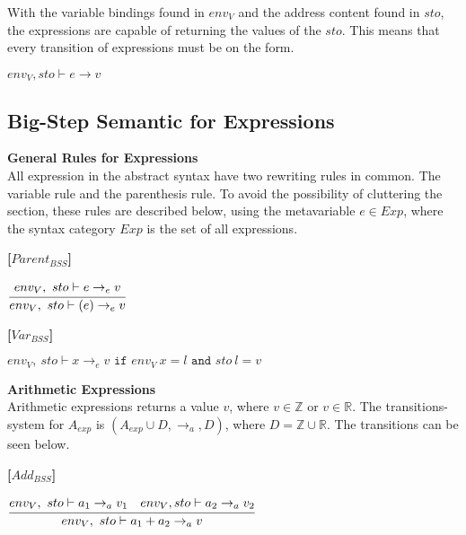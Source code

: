 {With the variable bindings found in $env_V$ and the address content found in $sto$, the expressions are capable of returning the values of the $sto$.
This means that every transition of expressions must be on the form.
\begin{center}
	$env_V,sto \vdash e \rightarrow v$
\end{center} 

\subsection{Big-Step Semantic for Expressions}

\textbf{\large{General Rules for Expressions}} \\
All expression in the abstract syntax have two rewriting rules in common.
The variable rule and the parenthesis rule.
To avoid the possibility of cluttering the section, these rules are described below, using the metavariable $e \in Exp$, where the syntax category $Exp$ is the set of all expressions.

\textbf{[$Parent_{BSS}$]}
\begin{center}
	\begin{math}
	\cfrac
		{env_V,\ sto \vdash e \rightarrow_e v}
		{env_V,\ sto \vdash (e) \rightarrow_e v}
	\end{math}
\end{center}

\textbf{[$Var_{BSS}$]}
\begin{center}
	\begin{math}
	env_V,\ sto \vdash x \rightarrow_e v
	\texttt{ if } env_V\ x = l
	\texttt{ and } sto\ l = v
	\end{math}
\end{center}

\textbf{\large{Arithmetic Expressions}}\\
Arithmetic expressions returns a value $v$, where $v \in \mathbb{Z}$ or $v \in \mathbb{R}$.
The transitions-system for $A_{exp}$ is $(A_{exp} \cup D, \rightarrow_a, D)$, 
where $D = \mathbb{Z} \cup \mathbb{R}$.
The transitions can be seen below.

\textbf{[$Add_{BSS}$]}\\
\begin{center}
	\begin{math}
	\cfrac
		{env_V,\ sto \vdash a_1 \rightarrow_a v_1 \quad env_V, sto \vdash a_2 \rightarrow_a v_2}
		{env_V,\ sto \vdash a_1 + a_2 \rightarrow_a v}
	\end{math}
	

\end{center}}
